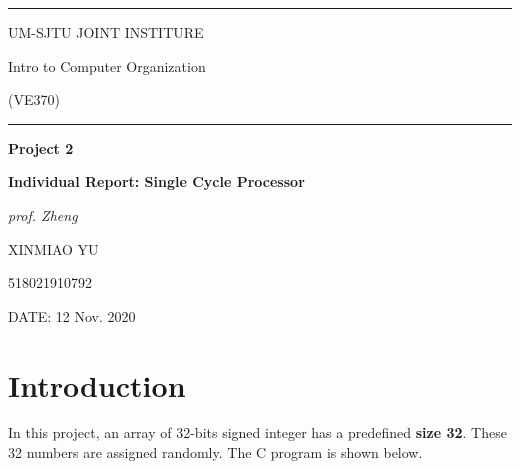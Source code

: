 \documentclass[a4paper]{article}
\begin{document}
	\begin{titlepage}
	\vspace{200pt}


		\begin{center}
		\rule[0pt]{12cm}{0.05em}
		
		 \Large{UM-SJTU \quad JOINT \quad INSTITURE}
		 \vspace{8pt}
		
		 
		 Intro to Computer Organization
		 
		 (VE370)		 
		 
		 \rule[0pt]{12cm}{0.05em}
		 
		 \vspace{50pt}
		 
		  {\fontsize{15}{30}\selectfont \textbf{Project 2}}
		  
		  		  {\fontsize{15}{30}\selectfont \textbf{Individual Report: Single Cycle Processor}}
		  \vspace{8pt}

		  {\fontsize{15}{30}\selectfont \textit{prof. Zheng}}
		  
		 
		 \vspace{250pt}

		 
		

		 
		XINMIAO YU 
		
		518021910792 
		\vspace{5pt}
		
		\vspace{80pt}
		 \end{center}
		 
		DATE: 12 Nov. 2020
	\end{titlepage}
	
	\pagestyle{plain}
	
	\section{Introduction}
In this project, an array of 32-bits signed integer has a predefined \textbf{size 32}. These 32 numbers are assigned randomly. The C program is shown below. 
\end{document}
